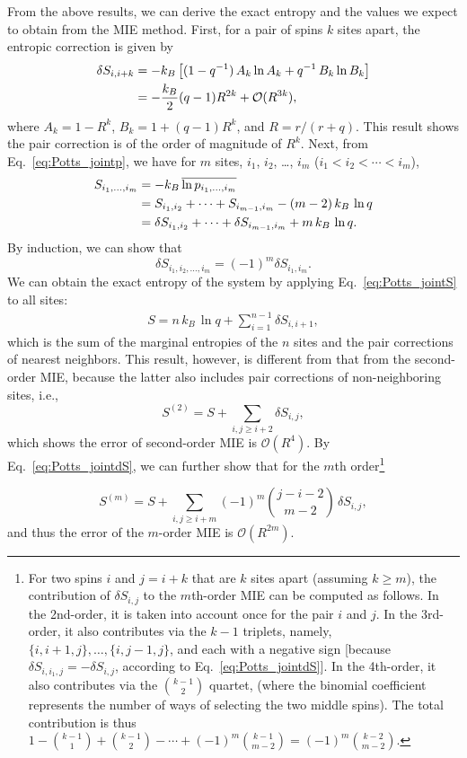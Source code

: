 \documentclass[reprint, superscriptaddress]{revtex4-1}
\begin{document}
From the above results, we can derive the exact entropy
and the values we expect to obtain from the MIE method.
%
First, for a pair of spins $k$ sites apart,
the entropic correction is given by
\begin{align}
  \delta S_{i, i+k}
  &=
  -k_B \left[
    (1 - q^{-1}) \, A_k \ln A_k
  + q^{-1} \, B_k \ln B_k \right]
  \notag\\
  &=
  -\frac{k_B}{2} (q-1) R^{2k}
  +\mathcal{O}(R^{3k})
 ,
\end{align}
where
$A_k = 1 - R^k$,
$B_k = 1 + (q-1) R^k$,
and $R = r/(r+q)$.
%
This result shows the pair correction is of the order of magnitude of $R^k$.
%
Next, from Eq.~\eqref{eq:Potts_jointp},
we have for $m$ sites,
$i_1$, $i_2$, \dots, $i_m$ ($i_1 < i_2 < \cdots < i_m$),
\begin{align}
S_{i_1, \dots, i_m}
  &= - k_B \, \overline{\ln p_{i_1,\dots, i_m}}
  \notag\\
  &= S_{i_1,i_2} + \cdots + S_{i_{m-1},i_m} - (m-2) \, k_B \, \ln q
  \notag\\
  &= \delta S_{i_1,i_2} + \cdots + \delta S_{i_{m-1},i_m} + m \, k_B \, \ln q
  .
  \label{eq:Potts_jointS}
\end{align}
By induction, we can show that
%
\begin{equation}
  \delta S_{i_1, i_2, \dots, i_m} = (-1)^m \delta S_{i_1, i_m}.
  \label{eq:Potts_jointdS}
\end{equation}
%
We can obtain the exact entropy of the system
by applying Eq.~\eqref{eq:Potts_jointS} to all sites:
\begin{align*}
  S =
  n \, k_B \, \ln q
  + \sum_{i=1}^{n-1} \delta S_{i,i+1}
  ,
\end{align*}
which is the sum of the marginal entropies of the $n$ sites
and the pair corrections of nearest neighbors.
%
This result, however, is different from that from the second-order MIE,
because the latter also includes pair corrections
of non-neighboring sites, i.e.,
$$
S^{(2)} = S + \sum_{i, j \ge i+2} \delta S_{i, j}
,
$$
which shows the error of second-order MIE is $\mathcal O(R^4)$.
By Eq.~\eqref{eq:Potts_jointdS}, we can further show that
for the $m$th order\footnote{
  For two spins $i$ and $j = i + k$ that are $k$ sites apart (assuming $k \ge m$),
  the contribution of $\delta S_{i, j}$ to the $m$th-order MIE
  can be computed as follows.
  In the 2nd-order, it is taken into account once for the pair $i$ and $j$.
  In the 3rd-order, it also contributes via the $k-1$ triplets, namely,
  $\{i, i+1, j\}, \dots, \{i, j-1, j\}$,
  and each with a negative sign [because $\delta S_{i,i_1,j} = -\delta S_{i,j}$,
  according to Eq.~\eqref{eq:Potts_jointdS}].
  In the 4th-order, it also contributes via the ${k-1 \choose 2}$ quartet,
  (where the binomial coefficient represents the number of ways
  of selecting the two middle spins).
  The total contribution is thus
  $1 - {k-1 \choose 1} + {k-1 \choose 2} - \cdots + (-1)^{m}{k-1 \choose m-2}
  = (-1)^m {k-2 \choose m-2}$.
}

$$
S^{(m)} = S + \sum_{i, j \ge i+m} (-1)^m {j-i-2 \choose m-2} \, \delta S_{i,j}
,
$$
and thus the error of the $m$-order MIE is $\mathcal O(R^{2m})$.



\end{document}
